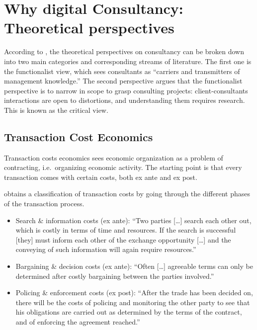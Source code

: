 \documentclass[12pt]{article}
\begin{document}
\section{Why digital Consultancy: Theoretical
perspectives}\label{why-digital-consultancy-theoretical-perspectives}

According to \citet[3-6]{armbruster2006}, the theoretical perspectives
on consultancy can be broken down into two main categories and
corresponding streams of literature. The first one is the functionalist
view, which sees consultants as ``carriers and transmitters of
management knowledge.'' The second perspective argues that the
functionalist perspective is to narrow in scope to grasp consulting
projects: client-consultants interactions are open to distortions, and
understanding them requires research. This is known as the critical
view.

\subsection{Transaction Cost
Economics}\label{transaction-cost-economics}

Transaction costs economics sees economic organization as a problem of
contracting, i.e.~organizing economic activity. The starting point is
that every transaction comes with certain costs, both ex ante and ex
post.

\citet[147-148]{dahlman1979} obtains a classification of transaction
costs by going through the different phases of the transaction process.

\begin{itemize}
\item
  Search \& information costs (ex ante): ``Two parties {[}\ldots{]}
  search each other out, which is costly in terms of time and resources.
  If the search is successful {[}they{]} must inform each other of the
  exchange opportunity {[}\ldots{]} and the conveying of such
  information will again require resources.''
\item
  Bargaining \& decision costs (ex ante): ``Often {[}\ldots{]} agreeable
  terms can only be determined after costly bargaining between the
  parties involved.''
\item
  Policing \& enforcement costs (ex post): ``After the trade has been
  decided on, there will be the costs of policing and monitoring the
  other party to see that his obligations are carried out as determined
  by the terms of the contract, and of enforcing the agreement
  reached.''
\end{itemize}
\end{document}
